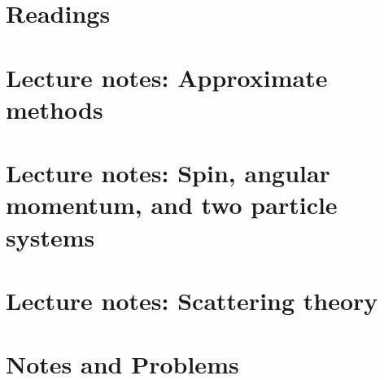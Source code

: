 \part{Readings}
   

\part{Lecture notes: Approximate methods}
   
   
   
   
   
   
   
   
   
   
   

\part{Lecture notes: Spin, angular momentum, and two particle systems}
   
   
   
   
   
   
   
   
   
   

\part{Lecture notes: Scattering theory}
   
   
   
   
   

\part{Notes and Problems}
   
   
   
   
   
   
   
   
   
   
   
   
   
   
   
   
